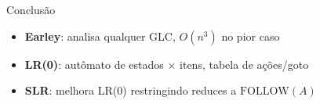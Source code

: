 \begin{frame}{Conclusão}

    \begin{itemize}

        \item
        \textbf{Earley}: analisa qualquer GLC, \(O(n^3)\) no pior caso
        \item
        \textbf{LR(0)}: autômato de estados × itens, tabela de ações/goto
        \item
        \textbf{SLR}: melhora LR(0) restringindo reduces a
        \(\mathrm{FOLLOW}(A)\)
    \end{itemize}
\end{frame}
